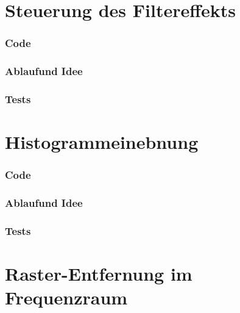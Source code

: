 \documentclass[12pt,german]{article}
\begin{document}
\section{Steuerung des Filtereffekts }
\subsubsection{Code}

\subsubsection{Ablaufund Idee}

\subsubsection{Tests}

\newpage
\section{Histogrammeinebnung  }
\subsubsection{Code}

\subsubsection{Ablaufund Idee}

\subsubsection{Tests}


\newpage
\section{ Raster-Entfernung im Frequenzraum}
\end{document}
